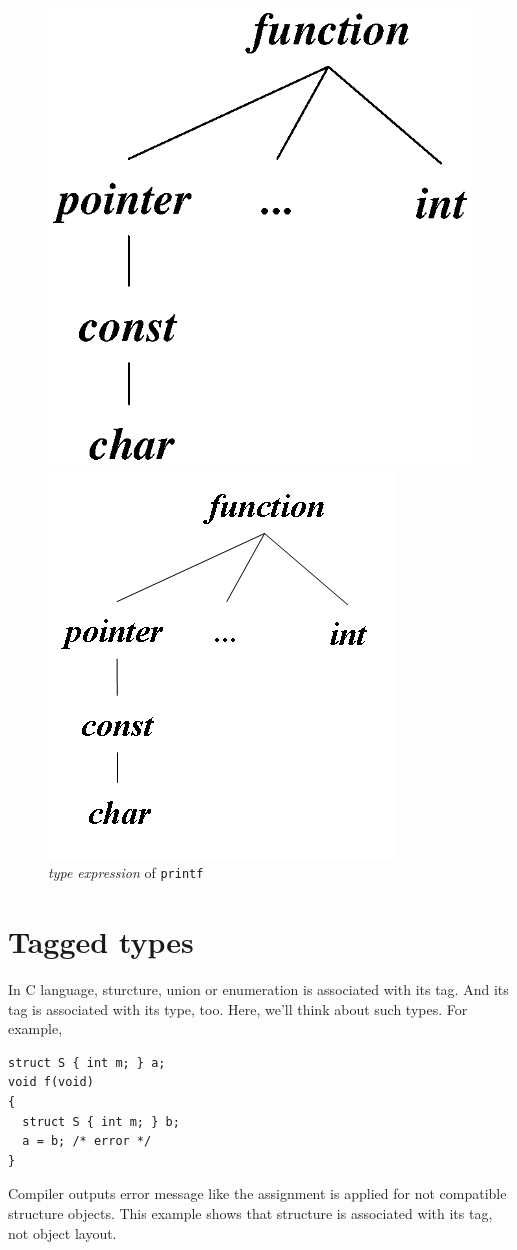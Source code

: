 \begin{figure}[htbp]
\begin{center}
\begin{latexonly}
\includegraphics[width=0.5\linewidth,height=0.5\linewidth]{ellipsis_type.eps}
\end{latexonly}
\begin{htmlonly}
\includegraphics{ellipsis_type.png}
\end{htmlonly}
\caption{{\em type expression} of {\tt{printf}}}
\label{type_e009}
\end{center}
\end{figure}

\section{Tagged types}
\label{type_e010}
In C language, sturcture, union or enumeration is
associated with its tag. And its tag is associated
with its type, too. Here, we'll think about such types.
For example,
\begin{verbatim}
struct S { int m; } a;
void f(void)
{
  struct S { int m; } b;
  a = b; /* error */
}
\end{verbatim}
Compiler outputs error message like the assignment is applied for 
not compatible structure objects. This example shows
that structure is associated with its tag, not object layout.

